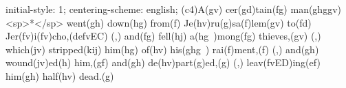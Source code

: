 initial-style: 1;
centering-scheme: english;
(c4)A(gv) cer(gd)tain(fg) man(ghggv) <sp>*</sp> went(gh) down(hg) from(f) Je(hv)ru(g)sa(f)lem(gv) to(fd) Jer(fv)i(fv)cho,(defvEC) (,) and(fg) fell(hj) a(hg~)mong(fg) thieves,(gv) (,) which(jv) stripped(kij) him(hg) of(hv) his(ghg~) rai(f)ment,(f) (,) and(gh) wound(jv)ed(h) him,(gf) and(gh) de(hv)part(g)ed,(g) (,) leav(fvED)ing(ef) him(gh) half(hv) dead.(g)